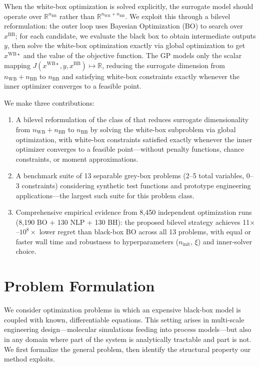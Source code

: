 \documentclass[12pt,a4paper]{article}%
\theoremstyle{plain}%
\theoremstyle{remark}%
\theoremstyle{definition}%
\def\WB{\mathrm{WB}}
\def\BB{\mathrm{BB}}
\begin{document}
When the white-box optimization is solved explicitly, the surrogate model should operate over $\mathbb{R}^{n_{\BB}}$ rather than $\mathbb{R}^{n_{\WB}+n_{\BB}}$. We exploit this through a bilevel reformulation: the outer loop uses Bayesian Optimization (BO) to search over $x^{\BB}$; for each candidate, we evaluate the black box to obtain intermediate outputs $y$, then solve the white-box optimization exactly via global optimization to get $x^{\WB\star}$ and the value of the objective function. The GP models only the scalar mapping $J(x^{\WB\star}, y, x^{\BB})\mapsto \mathbb{R}$, reducing the surrogate dimension from $n_{\WB}+n_{\BB}$ to $n_{\BB}$ and satisfying white-box constraints exactly whenever the inner optimizer converges to a feasible point.

We make three contributions:
\begin{enumerate}
    \item A bilevel reformulation of the class of  that reduces surrogate dimensionality from $n_{\WB}+n_{\BB}$ to $n_{\BB}$ by solving the white-box subproblem via global optimization, with white-box constraints satisfied exactly whenever the inner optimizer converges to a feasible point---without penalty functions, chance constraints, or moment approximations.
    \item A benchmark suite of 13 separable grey-box problems (2--5 total variables, 0--3 constraints) considering synthetic test functions and prototype engineering applications---the largest such suite for this problem class.
    \item Comprehensive empirical evidence from 8{,}450 independent optimization runs (8{,}190 BO + 130 NLP + 130 BH): the proposed bilevel strategy achieves 11$\times$--$10^{8}\times$ lower regret than black-box BO across all 13 problems, with equal or faster wall time and robustness to hyperparameters ($n_\text{init}$, $\xi$) and inner-solver choice.
\end{enumerate}

\section{Problem Formulation}\label{sec:problem_formulation}

We consider optimization problems in which an expensive black-box model is coupled with known, differentiable equations. This setting arises in multi-scale engineering design---molecular simulations feeding into process models---but also in any domain where part of the system is analytically tractable and part is not. We first formalize the general problem, then identify the structural property our method exploits.
\end{document}
